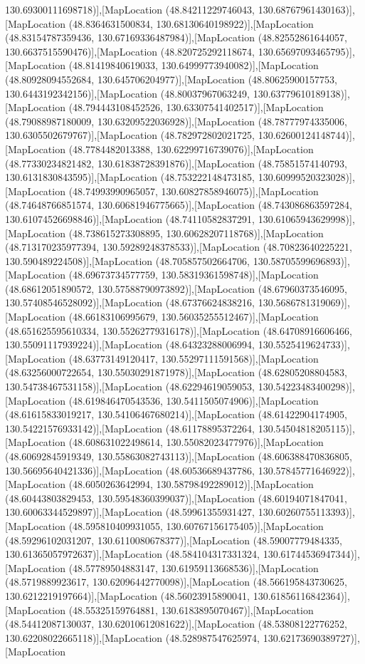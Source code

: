 130.69300111698718)],[MapLocation (48.84211229746043, 130.68767961430163)],[MapLocation (48.8364631500834, 130.68130640198922)],[MapLocation (48.83154787359436, 130.67169336487984)],[MapLocation (48.82552861644057, 130.6637515590476)],[MapLocation (48.820725292118674, 130.65697093465795)],[MapLocation (48.81419840619033, 130.64999773940082)],[MapLocation (48.80928094552684, 130.645706204977)],[MapLocation (48.80625900157753, 130.6443192342156)],[MapLocation (48.80037967063249, 130.63779610189138)],[MapLocation (48.794443108452526, 130.63307541402517)],[MapLocation (48.79088987180009, 130.63209522036928)],[MapLocation (48.78777974335006, 130.6305502679767)],[MapLocation (48.782972802021725, 130.62600124148744)],[MapLocation (48.7784482013388, 130.62299716739076)],[MapLocation (48.77330234821482, 130.61838728391876)],[MapLocation (48.75851574140793, 130.6131830843595)],[MapLocation (48.753222148473185, 130.60999520323028)],[MapLocation (48.74993990965057, 130.60827858946075)],[MapLocation (48.74648766851574, 130.60681946775665)],[MapLocation (48.743086863597284, 130.61074526698846)],[MapLocation (48.74110582837291, 130.61065943629998)],[MapLocation (48.738615273308895, 130.60628207118768)],[MapLocation (48.713170235977394, 130.59289248378533)],[MapLocation (48.70823640225221, 130.590489224508)],[MapLocation (48.705857502664706, 130.58705599696893)],[MapLocation (48.69673734577759, 130.58319361598748)],[MapLocation (48.68612051890572, 130.57588790973892)],[MapLocation (48.67960373546095, 130.57408546528092)],[MapLocation (48.67376624838216, 130.5686781319069)],[MapLocation (48.66183106995679, 130.56035255512467)],[MapLocation (48.651625595610334, 130.55262779316178)],[MapLocation (48.64708916606466, 130.55091117939224)],[MapLocation (48.64323288006994, 130.5525419624733)],[MapLocation (48.63773149120417, 130.55297111591568)],[MapLocation (48.63256000722654, 130.55030291871978)],[MapLocation (48.62805208804583, 130.54738467531158)],[MapLocation (48.62294619059053, 130.54223483400298)],[MapLocation (48.619846470543536, 130.5411505074906)],[MapLocation (48.61615833019217, 130.54106467680214)],[MapLocation (48.61422904174905, 130.54221576933142)],[MapLocation (48.61178895372264, 130.54504818205115)],[MapLocation (48.608631022498614, 130.55082023477976)],[MapLocation (48.60692845919349, 130.55863082743113)],[MapLocation (48.606388470836805, 130.56695640421336)],[MapLocation (48.60536689437786, 130.57845771646922)],[MapLocation (48.6050263642994, 130.58798492289012)],[MapLocation (48.60443803829453, 130.59548360399037)],[MapLocation (48.60194071847041, 130.60063344529897)],[MapLocation (48.59961355931427, 130.60260755113393)],[MapLocation (48.595810409931055, 130.60767156175405)],[MapLocation (48.59296102031207, 130.6110080678377)],[MapLocation (48.59007779484335, 130.61365057972637)],[MapLocation (48.584104317331324, 130.61744536947344)],[MapLocation (48.57789504883147, 130.61959113668536)],[MapLocation (48.5719889923617, 130.62096442770098)],[MapLocation (48.566195843730625, 130.6212219197664)],[MapLocation (48.56023915890041, 130.61856116842364)],[MapLocation (48.55325159764881, 130.6183895070467)],[MapLocation (48.54412087130037, 130.62010612081622)],[MapLocation (48.53808122776252, 130.62208022665118)],[MapLocation (48.528987547625974, 130.62173690389727)],[MapLocation 